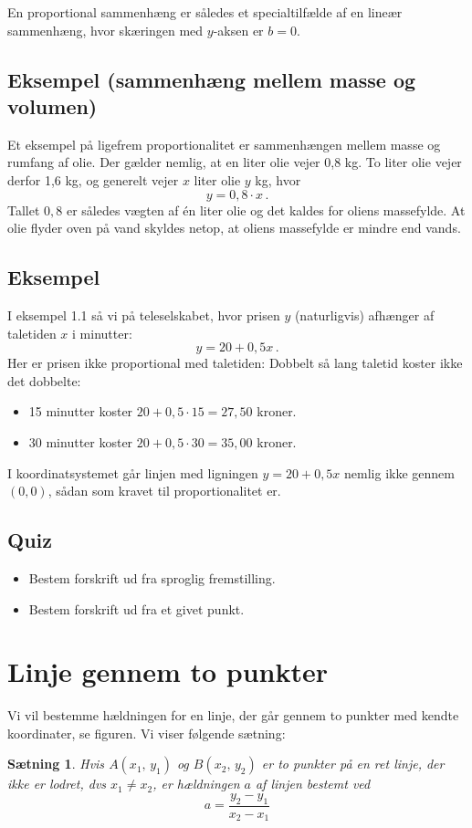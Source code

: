\documentclass[12pt,oneside,a4paper]{article}
\newtheorem{thm}{Sætning}[section]
\begin{document}
En proportional sammenhæng er således et specialtilfælde af en lineær sammenhæng, hvor
skæringen med $y$-aksen er $b=0$.

\subsection{Eksempel (sammenhæng mellem masse og volumen)}

Et eksempel på ligefrem proportionalitet er sammenhængen mellem masse og rumfang af olie.
Der gælder nemlig, at en liter olie vejer 0,8 kg. To liter olie vejer derfor 1,6 kg,
og generelt vejer $x$ liter olie $y$ kg, hvor
\[
y = 0,8 \cdot x \,.
\]
Tallet $0,8$ er således vægten af én liter olie og det kaldes for oliens
massefylde.  At olie flyder oven på vand skyldes netop, at oliens massefylde er
mindre end vands.

\subsection{Eksempel}
I eksempel 1.1 så vi på teleselskabet, hvor prisen $y$ (naturligvis) afhænger af
taletiden $x$ i minutter:
\[
y=20+0,5x \,.
\]
Her er prisen ikke proportional med taletiden: Dobbelt så lang taletid koster ikke
det dobbelte:
\begin{itemize}
    \item 15 minutter koster $20+0,5\cdot 15 = 27,50$ kroner.
    \item 30 minutter koster $20+0,5\cdot 30 = 35,00$ kroner.
\end{itemize}
I koordinatsystemet går linjen med ligningen $y=20+0,5x$ nemlig ikke gennem $(0, 0)$,
sådan som kravet til proportionalitet er.

\subsection{Quiz}
\begin{itemize}
    \item Bestem forskrift ud fra sproglig fremstilling.
    \item Bestem forskrift ud fra et givet punkt.
\end{itemize}


\section{Linje gennem to punkter}
Vi vil bestemme hældningen for en linje, der går gennem
to punkter med kendte koordinater, se figuren. Vi viser følgende sætning:
\begin{thm}
    Hvis $A(x_1,\,y_1)$ og $B(x_2,\,y_2)$ er to punkter på en ret linje, der ikke
    er lodret, dvs $x_1\neq x_2$, er hældningen $a$ af linjen bestemt ved
    $$
    a = \frac{y_2-y_1}{x_2-x_1}
    $$
\end{thm}
\end{document}
